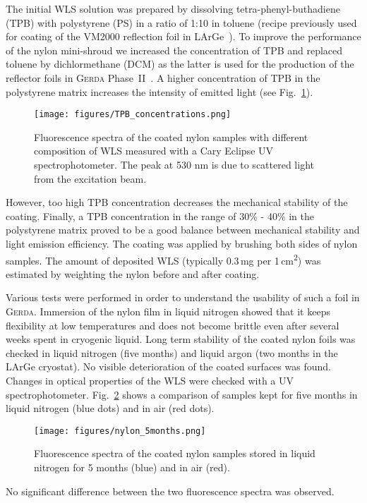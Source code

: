 \documentclass[twocolumn,epjc3]{svjour3}
\newcommand{\Gerda} {{\textsc{Gerda}\xspace}}
\newcommand{\LArGe} {{{LArGe}\xspace}}
\newcommand{\ts}{\textsuperscript}
\begin{document}
The initial WLS solution was prepared by dissolving tetra-phenyl-buthadiene (TPB) with polystyrene (PS) in a ratio of 1:10 in toluene (recipe previously used for coating of the VM2000 reflection foil in \LArGe{}~\cite{Peiffer_PhD}). To improve the performance of the nylon mini-shroud we increased the concentration of TPB and replaced toluene by dichlormethane (DCM) as the latter is used for the production of the reflector foils in \Gerda{} Phase~II~\cite{GERDAfoils}. A higher concentration of TPB in the polystyrene matrix increases the intensity of emitted light (see Fig.~\ref{fig:aging1}).
%
\begin{figure}
  \begin{center}
    \texttt{[image: figures/TPB\_concentrations.png]}
    \caption{\label{fig:aging1}Fluorescence spectra of the coated nylon samples with different composition of WLS  measured with a Cary Eclipse UV spectrophotometer. The peak at 530 nm is due to scattered light from the excitation beam.}
  \end{center}
\end{figure}
%
However, too high TPB concentration decreases the mechanical stability of the coating. Finally, a TPB concentration in the range of 30\% - 40\% in the polystyrene matrix proved to be a good balance between mechanical stability and light emission efficiency. The coating was applied by brushing both sides of nylon samples. The amount of deposited WLS (typically 0.3\,mg per 1\,cm\ts{2}) was estimated by weighting the nylon before and after coating. 
 
Various tests were performed in order to understand the usability of such a foil in \Gerda{}. Immersion of the nylon film in liquid nitrogen showed that it keeps flexibility at low temperatures and does not become brittle even after several weeks spent in cryogenic liquid. Long term stability of the coated nylon foils was checked in liquid nitrogen (five months) and liquid argon (two months in the \LArGe{} cryostat). No visible deterioration of the coated surfaces was found. Changes in optical properties of the WLS were checked with a UV spectrophotometer. Fig.~\ref{fig:aging2} shows a comparison of samples kept for five months in liquid nitrogen (blue dots) and in air (red dots). 
%
\begin{figure}
  \begin{center}
    \texttt{[image: figures/nylon\_5months.png]}
    \caption{\label{fig:aging2}Fluorescence spectra of the coated nylon samples
      stored in liquid nitrogen for 5 months (blue) and in air (red).}
  \end{center}
\end{figure}
%
No significant difference between the two fluorescence spectra was observed.
\end{document}
